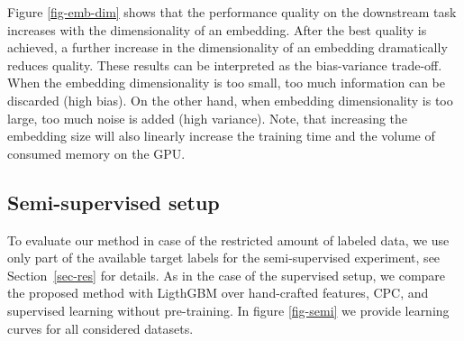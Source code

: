 \documentclass[sigconf]{acmart}
\begin{document}
Figure \ref{fig-emb-dim} shows that the performance quality on the downstream task increases with the dimensionality of an embedding. After the best quality is achieved, a further increase in the dimensionality of an embedding dramatically reduces quality.
These results can be interpreted as the bias-variance trade-off. When the embedding dimensionality is too small, too much information can be discarded (high bias). On the other hand, when embedding dimensionality is too large, too much noise is added (high variance).
Note, that increasing the embedding size will also linearly increase the training time and the volume of consumed memory on the GPU.

\iffalse

\subsection{Semi-supervised setup} \label{app-sec-semi}

To evaluate our method in case of the restricted amount of labeled data, we use only part of the available target labels for the semi-supervised experiment, see Section~\ref{sec-res} for details. As in the case of the supervised setup, we compare the proposed method with LigthGBM over hand-crafted features, CPC, and supervised learning without pre-training. In figure \ref{fig-semi} we provide learning curves for all considered datasets.
\end{document}
